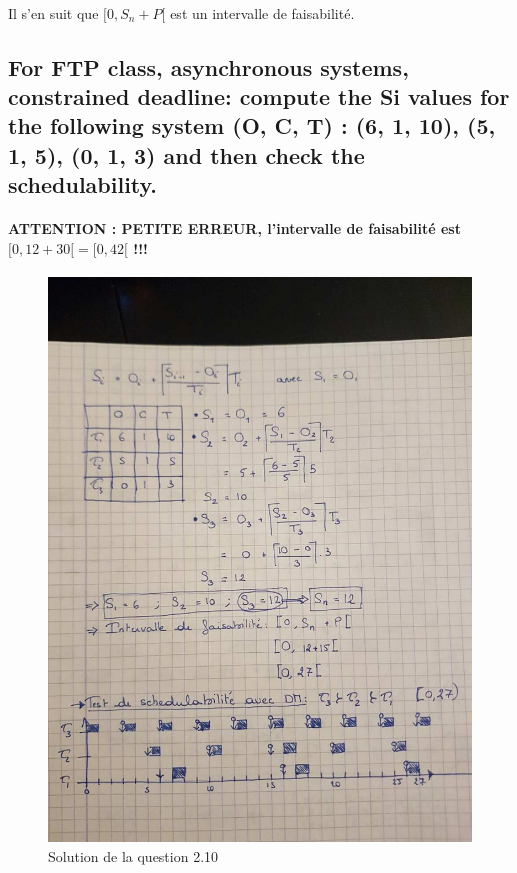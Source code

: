 \paragraph{}
Il s'en suit que $[0, S_{n} + P[$ est un intervalle de faisabilité.

\newpage
\subsection{For FTP class, asynchronous systems, constrained deadline: compute the Si values for the following system (O, C, T) : (6, 1, 10), (5, 1, 5), (0, 1, 3) and then check the schedulability.}
\paragraph{ATTENTION : PETITE ERREUR, l'intervalle de faisabilité est $[0, 12 + 30[ = [0, 42[$ !!!}
\begin{figure}[H]
\centering
\caption{Solution de la question 2.10}
\includegraphics[scale=0.33]{img_2_10__0}
\end{figure}



